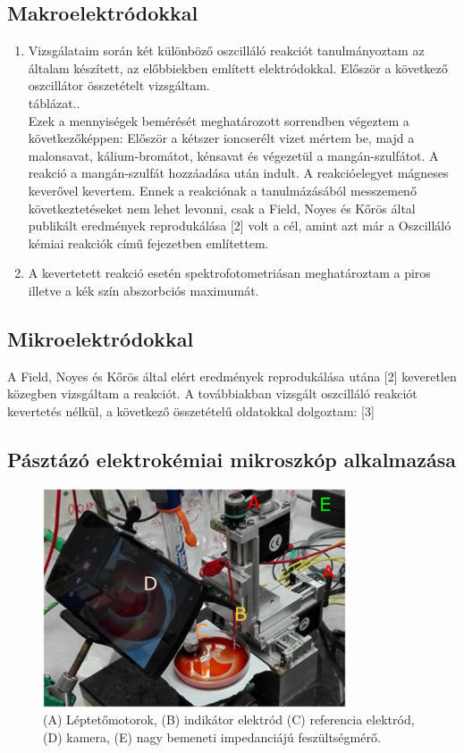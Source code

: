\subsection{Makroelektródokkal}
\begin{enumerate}
\item Vizsgálataim során két különböző oszcilláló reakciót tanulmányoztam az általam készített, az előbbiekben említett elektródokkal. 
Először a következő oszcillátor összetételt vizsgáltam.\\
táblázat..\\
Ezek a mennyiségek bemérését meghatározott sorrendben végeztem a következőképpen: Először a kétszer ioncserélt vizet mértem be, majd a malonsavat, kálium-bromátot, kénsavat és végezetül a mangán-szulfátot. A reakció a mangán-szulfát hozzáadása után indult. A reakcióelegyet mágneses keverővel kevertem. Ennek a reakciónak a tanulmázásából messzemenő következtetéseket nem lehet levonni, csak a Field, Noyes és Kőrös által publikált eredmények reprodukálása [2] volt a cél, amint azt már a Oszcilláló kémiai reakciók című fejezetben említettem.
\item A kevertetett reakció esetén spektrofotometriásan meghatároztam a piros illetve a kék szín abszorbciós maximumát.
\end{enumerate}

\subsection{Mikroelektródokkal} 

A Field, Noyes és Kőrös által elért eredmények reprodukálása utána [2] keveretlen közegben vizsgáltam a reakciót.
A továbbiakban vizsgált oszcilláló reakciót kevertetés nélkül, a következő összetételű oldatokkal dolgoztam: [3]

\subsection{Pásztázó elektrokémiai mikroszkóp alkalmazása}



\begin{figure}[h]
\centering
\includegraphics[width=0.8\textwidth]{img/secm.png}
\caption{(A) Léptetőmotorok, (B) indikátor elektród (C) referencia elektród, (D) kamera, (E) nagy bemeneti impedanciájú feszültségmérő.}
\label{fig:secm}
\end{figure}

